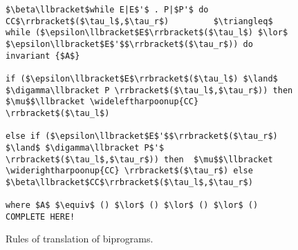 \begin{figure}[ht]
\begin{minipage}{0.99\linewidth}
\begin{lstlisting}
$\beta\llbracket$while E|E$'$ . P|$P'$ do CC$\rrbracket$($\tau_l$,$\tau_r$)         $\triangleq$ while ($\epsilon\llbracket$E$\rrbracket$($\tau_l$) $\lor$ $\epsilon\llbracket$E$'$$\rrbracket$($\tau_r$)) do invariant {$A$}
                                                                                  if ($\epsilon\llbracket$E$\rrbracket$($\tau_l$) $\land$ $\digamma\llbracket P \rrbracket$($\tau_l$,$\tau_r$)) then $\mu$$\llbracket \wideleftharpoonup{CC} \rrbracket$($\tau_l$)
                                                                                  else if ($\epsilon\llbracket$E$'$$\rrbracket$($\tau_r$) $\land$ $\digamma\llbracket P$'$ \rrbracket$($\tau_l$,$\tau_r$)) then  $\mu$$\llbracket \widerightharpoonup{CC} \rrbracket$($\tau_r$) else $\beta\llbracket$CC$\rrbracket$($\tau_l$,$\tau_r$)
                                                                            where $A$ $\equiv$ () $\lor$ () $\lor$ () $\lor$ () COMPLETE HERE!
  \end{lstlisting}
  \end{minipage}
  \caption{Rules of translation of biprograms.}
  \label{fig:translation-biprograms-rules}
\end{figure}

